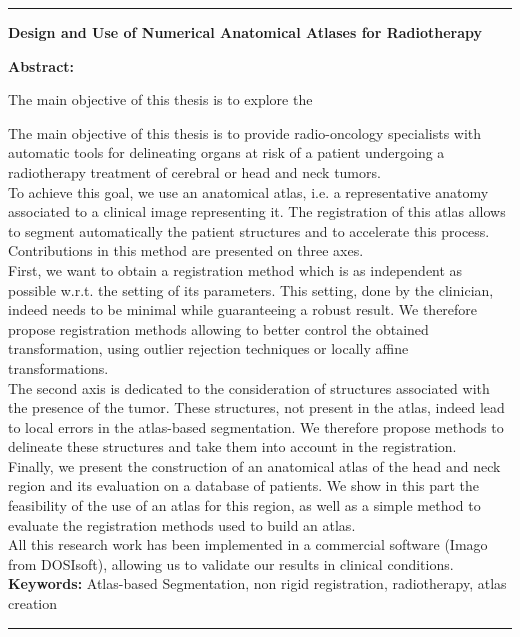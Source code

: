 
\cleardoublepage
\begin{vcenterpage}
\noindent\rule[2pt]{\textwidth}{0.5pt}
\begin{center}
{\large\textbf{Design and Use of Numerical Anatomical Atlases for Radiotherapy\\}}
\end{center}
{\large\textbf{Abstract:}}

The main objective of this thesis is to explore the 

The main objective of this thesis is to provide radio-oncology specialists with automatic tools for delineating organs at risk of a patient undergoing a radiotherapy treatment of cerebral or head and neck tumors.
\\
To achieve this goal, we use an anatomical atlas, i.e. a representative anatomy associated to a clinical image representing it. The registration of this atlas allows to segment automatically the patient structures and to accelerate this process. Contributions in this method are presented on three axes.
\\
First, we want to obtain a registration method which is as independent as possible w.r.t. the setting of its parameters. This setting, done by the clinician, indeed needs to be minimal while guaranteeing a robust result. We therefore propose registration methods allowing to better control the obtained transformation, using outlier rejection techniques or locally affine transformations.
\\
The second axis is dedicated to the consideration of structures associated with the presence of the tumor. These structures, not present in the atlas, indeed lead to local errors in the atlas-based segmentation. We therefore propose methods to delineate these structures and take them into account in the registration.
\\
Finally, we present the construction of an anatomical atlas of the head and neck region and its evaluation on a database of patients. We show in this part the feasibility of the use of an atlas for this region, as well as a simple method to evaluate the registration methods used to build an atlas.
\\
All this research work has been implemented in a commercial software (Imago from DOSIsoft), allowing us to validate our results in clinical conditions.
\\
{\large\textbf{Keywords:}}
Atlas-based Segmentation, non rigid registration, radiotherapy, atlas creation
\\
\noindent\rule[2pt]{\textwidth}{0.5pt}
\end{vcenterpage}
